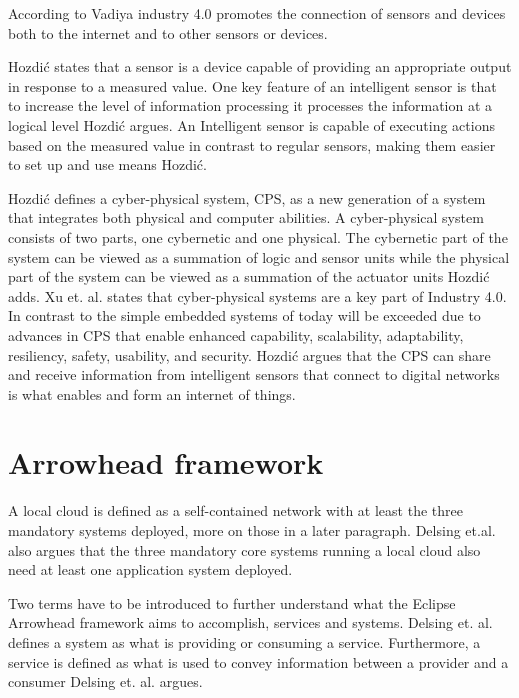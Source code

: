 According to Vadiya industry 4.0 promotes the connection of sensors and devices both to the internet and to other sensors or devices.\cite{Vaidya2018} 

Hozdić states that a sensor is a device capable of providing an appropriate output in response to a measured value.\cite{Hozdic2015}
One key feature of an intelligent sensor is that to increase the level of information processing it processes the information at a logical level Hozdić argues.\cite{Hozdic2015}
An Intelligent sensor  is capable of executing actions based on the measured value in contrast to regular sensors, making them easier to set up and use means Hozdić.\cite{Hozdic2015} 

Hozdić defines a cyber-physical system, CPS, as a new generation of a system that integrates both physical and computer abilities.\cite{Hozdic2015}
A cyber-physical system consists of two parts, one cybernetic and one physical.
The cybernetic part of the system can be viewed as a summation of logic and sensor units while the physical part of the system can be viewed as a summation of the actuator units Hozdić adds.\cite{Hozdic2015}
Xu et. al. states that cyber-physical systems are a key part of Industry 4.0. In contrast to the simple embedded systems of today will be exceeded due to advances in CPS that enable enhanced capability, scalability, adaptability, resiliency, safety, usability, and security.\cite{Xu2018}
Hozdić argues that the CPS can share and receive information from intelligent sensors that connect to digital networks is what enables and form an internet of things.\cite{Hozdic2015}
 
\section{Arrowhead framework}
A local cloud is defined as a self-contained network with at least the three mandatory systems deployed, more on those in a later paragraph. 
Delsing et.al. also argues that the three mandatory core systems running a local cloud also need at least one application system deployed.\cite{Delsing2017}

Two terms have to be introduced to further understand what the Eclipse Arrowhead framework aims to accomplish, services and systems.
Delsing et. al. defines a system as what is providing or consuming a service.\cite{Delsing2017} 
Furthermore, a service is defined as what is used to convey information between a provider and a consumer Delsing et. al. argues.\cite{Delsing2017}

